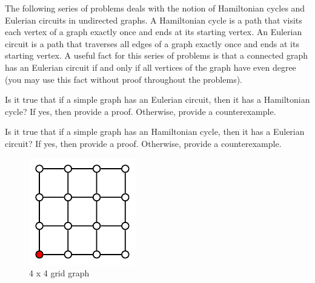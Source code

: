 \documentclass[12pt,twoside]{article}
\begin{document}
\begin{problem}{20}  The following series of problems deals with the notion of Hamiltonian cycles and Eulerian circuits in undirected graphs.  A Hamiltonian cycle is a path that visits each vertex of a graph exactly once and ends at its starting vertex.  An Eulerian circuit is a path that traverses all edges of a graph exactly once and ends at its starting vertex.  A useful fact for this series of problems is that a connected graph has an Eulerian circuit if and only if all vertices of the graph have even degree (you may use this fact without proof throughout the problems).

\bparts

 Is it true that if a simple graph has an Eulerian circuit, then it has a Hamiltonian cycle? If yes, then provide a proof.  Otherwise, provide a counterexample.

 Is it true that if a simple graph has an Hamiltonian cycle, then it has a Eulerian circuit? If yes, then provide a proof.  Otherwise, provide a counterexample.


            \begin{figure}[!ht]
                \begin{center}
                    \includegraphics[scale=1.5]{ps5-figs/GridGraph.pdf}
                \caption{4 x 4 grid graph}
                \label{1-fig1}
            \end{center}
            \end{figure}


\end{problem}
\end{document}
